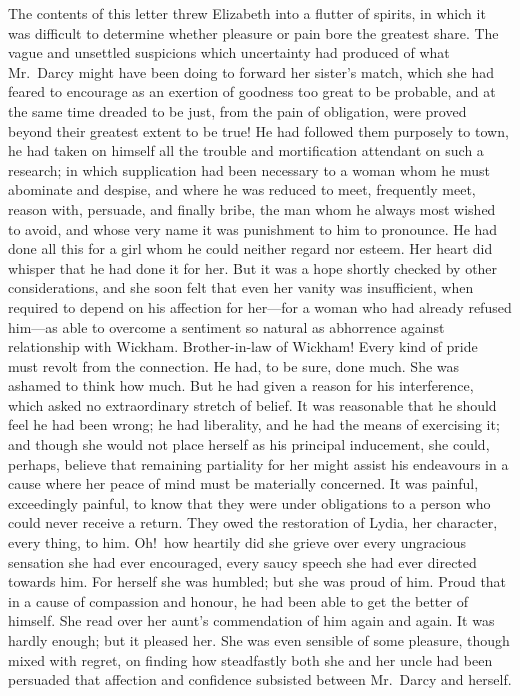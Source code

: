 \documentclass[12pt,english,oneside]{book}
\begin{document}
The contents of this letter threw Elizabeth into a flutter of spirits,
in which it was difficult to determine whether pleasure or pain bore
the greatest share. The vague and unsettled suspicions which uncertainty
had produced of what Mr.\ Darcy might have been doing to forward
her sister's match, which she had feared to encourage as an exertion
of goodness too great to be probable, and at the same time dreaded
to be just, from the pain of obligation, were proved beyond their
greatest extent to be true! He had followed them purposely to town,
he had taken on himself all the trouble and mortification attendant
on such a research; in which supplication had been necessary to a
woman whom he must abominate and despise, and where he was reduced
to meet, frequently meet, reason with, persuade, and finally bribe,
the man whom he always most wished to avoid, and whose very name it
was punishment to him to pronounce. He had done all this for a girl
whom he could neither regard nor esteem. Her heart did whisper that
he had done it for her. But it was a hope shortly checked by other
considerations, and she soon felt that even her vanity was insufficient,
when required to depend on his affection for her\mbox{---}for a woman
who had already refused him\mbox{---}as able to overcome a sentiment
so natural as abhorrence against relationship with Wickham. Brother-in-law
of Wickham! Every kind of pride must revolt from the connection. He
had, to be sure, done much. She was ashamed to think how much. But
he had given a reason for his interference, which asked no extraordinary
stretch of belief. It was reasonable that he should feel he had been
wrong; he had liberality, and he had the means of exercising it; and
though she would not place herself as his principal inducement, she
could, perhaps, believe that remaining partiality for her might assist
his endeavours in a cause where her peace of mind must be materially
concerned. It was painful, exceedingly painful, to know that they
were under obligations to a person who could never receive a return.
They owed the restoration of Lydia, her character, every thing, to
him. Oh!\ how heartily did she grieve over every ungracious sensation
she had ever encouraged, every saucy speech she had ever directed
towards him. For herself she was humbled; but she was proud of him.
Proud that in a cause of compassion and honour, he had been able to
get the better of himself. She read over her aunt's commendation of
him again and again. It was hardly enough; but it pleased her. She
was even sensible of some pleasure, though mixed with regret, on finding
how steadfastly both she and her uncle had been persuaded that affection
and confidence subsisted between Mr.\ Darcy and herself.
\end{document}
